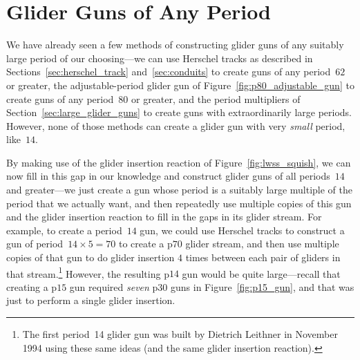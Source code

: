 \section{Glider Guns of Any Period}\label{sec:glider_gun_any_period}

We have already seen a few methods of constructing glider guns of any suitably large period of our choosing---we can use Herschel tracks as described in Sections~\ref{sec:herschel_track} and~\ref{sec:conduits} to create guns of any period~$62$ or greater, the adjustable-period glider gun of Figure~\ref{fig:p80_adjustable_gun} to create guns of any period~$80$ or greater, and the period multipliers of Section~\ref{sec:large_glider_guns} to create guns with extraordinarily large periods. However, none of those methods can create a glider gun with very \emph{small} period, like~$14$.

By making use of the glider insertion reaction of Figure~\ref{fig:lwss_squish}, we can now fill in this gap in our knowledge and construct glider guns of all periods~$14$ and greater---we just create a gun whose period is a suitably large multiple of the period that we actually want, and then repeatedly use multiple copies of this gun and the glider insertion reaction to fill in the gaps in its glider stream. For example, to create a period~$14$ gun, we could use Herschel tracks to construct a gun of period~$14 \times 5 = 70$ to create a p$70$ glider stream, and then use multiple copies of that gun to do glider insertion $4$ times between each pair of gliders in that stream.\footnote{The first period~14 glider gun was built by Dietrich Leithner in November 1994 using these same ideas (and the same glider insertion reaction).} However, the resulting p$14$ gun would be quite large---recall that creating a p$15$ gun required \emph{seven} p$30$ guns in Figure~\ref{fig:p15_gun}, and that was just to perform a single glider insertion.

